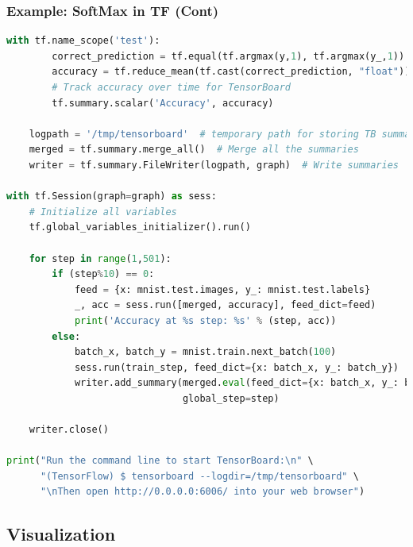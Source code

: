 \begin{frame}[fragile]
  \MyLogo
  \frametitle{Example: SoftMax in TF (Cont)}  

\ContinueLineNumber
\begin{lstlisting}[language=python]
    with tf.name_scope('test'):
        correct_prediction = tf.equal(tf.argmax(y,1), tf.argmax(y_,1))
        accuracy = tf.reduce_mean(tf.cast(correct_prediction, "float"))
        # Track accuracy over time for TensorBoard
        tf.summary.scalar('Accuracy', accuracy)

    logpath = '/tmp/tensorboard'  # temporary path for storing TB summaries
    merged = tf.summary.merge_all()  # Merge all the summaries
    writer = tf.summary.FileWriter(logpath, graph)  # Write summaries

with tf.Session(graph=graph) as sess:
    # Initialize all variables
    tf.global_variables_initializer().run()
    
    for step in range(1,501):
        if (step%10) == 0:
            feed = {x: mnist.test.images, y_: mnist.test.labels}
            _, acc = sess.run([merged, accuracy], feed_dict=feed)
            print('Accuracy at %s step: %s' % (step, acc))
        else:
            batch_x, batch_y = mnist.train.next_batch(100)
            sess.run(train_step, feed_dict={x: batch_x, y_: batch_y})
            writer.add_summary(merged.eval(feed_dict={x: batch_x, y_: batch_y}), 
                               global_step=step)

    writer.close()

print("Run the command line to start TensorBoard:\n" \
      "(TensorFlow) $ tensorboard --logdir=/tmp/tensorboard" \
      "\nThen open http://0.0.0.0:6006/ into your web browser")
\end{lstlisting}

\end{frame}

\subsection{Visualization}

